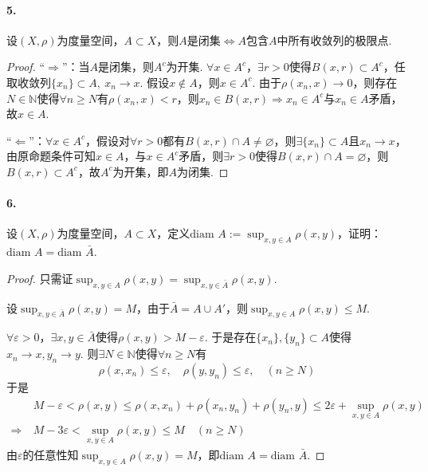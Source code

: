 \documentclass[12pt, a4paper, oneside]{ctexart}
\let\leq=\leqslant %
\let\geq=\geqslant %
\def\N{\mathbb{N}}          %
\def\diam{\text{diam }}      %
\begin{document}
\paragraph*{5.}设$(X,\rho)$为度量空间，$A\subset X$，则$A$是闭集$\iff$$A$包含$A$中所有收敛列的极限点.
\begin{proof}
    “$\Rightarrow$”：当$A$是闭集，则$A^c$为开集. $\forall x\in A^c$，$\exists r>0$使得$B(x, r)\subset A^c$，任取收敛列$\{x_n\}\subset A,\ x_n\to x$. 假设$x\notin A$，则$x\in A^c$. 由于$\rho(x_n,x)\to 0$，则存在$N\in\mathbb{N}$使得$\forall n\geq N$有$\rho(x_n, x) < r$，则$x_n\in B(x, r)\Rightarrow x_n\in A^c$与$x_n\in A$矛盾，故$x\in A$.

    “$\Leftarrow$”：$\forall x\in A^c$，假设对$\forall r>0$都有$B(x, r)\cap A\neq \varnothing$，则$\exists \{x_n\}\subset A$且$x_n\to x$，由原命题条件可知$x\in A$，与$x\in A^c$矛盾，则$\exists r >0$使得$B(x,r)\cap A=\varnothing$，则$B(x,r)\subset A^c$，故$A^c$为开集，即$A$为闭集.
\end{proof}

\paragraph*{6.}设$(X,\rho)$为度量空间，$A\subset X$，定义$\diam A:=\sup_{x,y\in A}\rho(x, y)$，证明：$\diam A=\diam\bar{A}$.
\begin{proof}
    只需证$\sup_{x,y\in A}\rho(x, y) = \sup_{x,y\in \bar{A}}\rho(x, y)$.
    
    设$\sup_{x,y\in\bar{A}}\rho(x,y)=M$，由于$\bar{A} = A\cup A'$，则$\sup_{x,y\in A}\rho(x, y)\leq M$.
    
    $\forall \varepsilon >0$，$\exists x, y\in\bar{A}$使得$\rho(x, y) > M-\varepsilon$. 于是存在$\{x_n\},\{y_n\}\subset A$使得$x_n\to x, y_n\to y$. 则$\exists N\in\N$使得$\forall n\geq N$有
    \begin{equation*}
        \rho(x, x_n)\leq \varepsilon,\quad \rho(y, y_n)\leq \varepsilon,\quad (n\geq N)
    \end{equation*}
    于是
    \begin{align*}
        &\ M-\varepsilon < \rho(x, y)\leq \rho(x,x_n)+\rho(x_n,y_n)+\rho(y_n, y)\leq 2\varepsilon + \sup_{x,y\in A}\rho(x, y)\\
        \Rightarrow&\ M-3\varepsilon< \sup_{x,y\in A}\rho(x, y)\leq M\quad (n\geq N)
    \end{align*}
    由$\varepsilon$的任意性知$\sup_{x, y\in A}\rho(x, y) = M$，即$\diam A = \diam \bar{A}$.
\end{proof}
\end{document}
